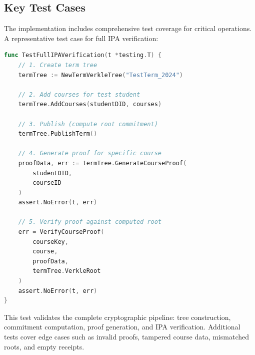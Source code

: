 \subsection{Key Test Cases}
\label{subsec:test-cases}

The implementation includes comprehensive test coverage for critical operations. A representative test case for full IPA verification:

\begin{lstlisting}[language=Go, caption=Full IPA Verification Test, label=lst:ipa-test]
func TestFullIPAVerification(t *testing.T) {
    // 1. Create term tree
    termTree := NewTermVerkleTree("TestTerm_2024")

    // 2. Add courses for test student
    termTree.AddCourses(studentDID, courses)

    // 3. Publish (compute root commitment)
    termTree.PublishTerm()

    // 4. Generate proof for specific course
    proofData, err := termTree.GenerateCourseProof(
        studentDID,
        courseID
    )
    assert.NoError(t, err)

    // 5. Verify proof against computed root
    err = VerifyCourseProof(
        courseKey,
        course,
        proofData,
        termTree.VerkleRoot
    )
    assert.NoError(t, err)
}
\end{lstlisting}

This test validates the complete cryptographic pipeline: tree construction, commitment computation, proof generation, and IPA verification. Additional tests cover edge cases such as invalid proofs, tampered course data, mismatched roots, and empty receipts.
